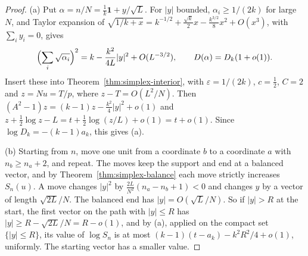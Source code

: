 \begin{proof}
(a) Put $\alpha=n/N=\frac1k\mathbf1+y/\sqrt L$. For $|y|$ bounded,
$\alpha_i\ge1/(2k)$ for large $N$, and Taylor expansion of
$\sqrt{1/k+x}=k^{-1/2}+\frac{\sqrt k}2x-\frac{k^{3/2}}8x^2+O(x^3)$, with
$\sum_iy_i=0$, gives
\[
 \Bigl(\sum_i\sqrt{\alpha_i}\Bigr)^2=k-\frac{k^2}{4L}|y|^2+O(L^{-3/2}),
 \qquad D(\alpha)=D_k(1+o(1)).
\]
Insert these into Theorem~\ref{thm:simplex-interior}, with $\varepsilon=1/(2k)$,
$c=\frac12$, $C=2$ and $z=Nu=T/p$, where $z-T=O(L^2/N)$. Then
$(A^2-1)z=(k-1)z-\frac{k^2}4|y|^2+o(1)$ and
$z+\frac12\log z-L=t+\frac12\log(z/L)+o(1)=t+o(1)$. Since
$\log D_k=-(k-1)a_k$, this gives (a).

(b) Starting from $n$, move one unit from a coordinate $b$ to a coordinate $a$
with $n_b\ge n_a+2$, and repeat. The moves keep the support and end at a
balanced vector, and by Theorem~\ref{thm:simplex-balance} each move strictly
increases $S_n(u)$. A move changes $|y|^2$ by $\frac{2L}{N^2}(n_a-n_b+1)<0$ and
changes $y$ by a vector of length $\sqrt{2L}/N$. The balanced end has
$|y|=O(\sqrt L/N)$. So if $|y|>R$ at the start, the first vector on the path
with $|y|\le R$ has $|y|\ge R-\sqrt{2L}/N=R-o(1)$, and by (a), applied on the
compact set $\{|y|\le R\}$, its value of $\log S_n$ is at most
$(k-1)(t-a_k)-k^2R^2/4+o(1)$, uniformly. The starting vector has a smaller value.
\end{proof}

